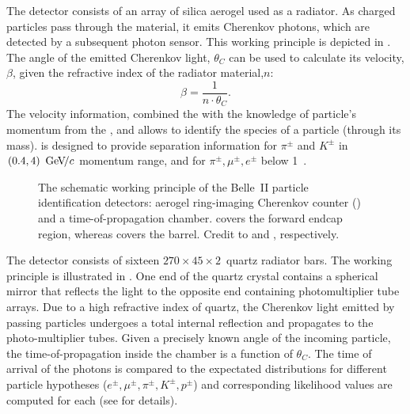 The \ARICH detector \cite{Yusa:2014tua} consists of an array of silica aerogel used as a radiator.
As charged particles pass through the material, it emits Cherenkov photons, which are detected by a subsequent photon sensor.
This working principle is depicted in .
The angle of the emitted Cherenkov light, $\theta_C$ can be used to calculate its velocity, $\beta$, given the refractive index of the radiator material,$n$:
\begin{equation}
    \beta = \frac{1}{n\cdot\theta_C}.
\end{equation}
The velocity information, combined the with the knowledge of particle's momentum from the \CDC, \SVD and \PXD allows to identify the species of a particle (through its mass).
\ARICH is designed to provide separation information for $\pi^{\pm}$ and $K^{\pm}$ in $(0.4,4)~{\mathrm{\,Ge\kern -0.1em V\!/}c}$ momentum range, and for $\pi^{\pm},\mu^{\pm},e^{\pm}$ below 1~\gevc.

\begin{figure}[htbp!]
    \centering
    \caption{\label{fig:pid}
    The schematic working principle of the Belle~II particle identification detectors: aerogel ring-imaging Cherenkov counter () and a time-of-propagation chamber.
    \ARICH covers the forward endcap region, whereas \TOP covers the barrel.
    Credit to \cite{Yusa:2014tua} and \cite{Fast:2017pff}, respectively.
    }
\end{figure}

The \TOP detector \cite{Fast:2017pff} consists of sixteen $270 \times 45 \times 2$~\cm quartz radiator bars.
The working principle is illustrated in .
One end of the quartz crystal contains a spherical mirror that reflects the light to the opposite end containing photomultiplier tube arrays.
Due to a high refractive index of quartz, the Cherenkov light emitted by passing particles undergoes a total internal reflection and propagates to the photo-multiplier tubes.
Given a precisely known angle of the incoming particle, the time-of-propagation inside the chamber is a function of $\theta_C$.
The time of arrival of the photons is compared to the expectated distributions for different particle hypotheses ($e^{\pm},\mu^{\pm},\pi^{\pm},K^{\pm},p^{\pm}$) and corresponding likelihood values are computed for each (see \cite{Yonenaga:2020eby} for details).

